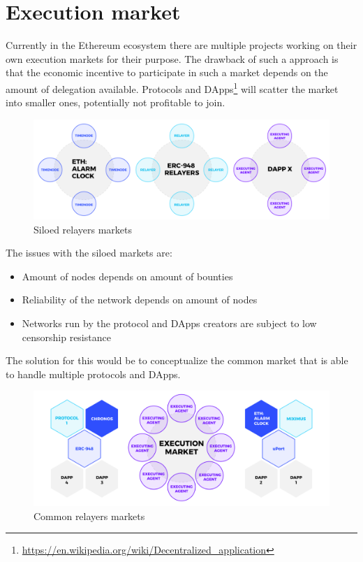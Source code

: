 \documentclass{report}
\begin{document}
  \section{Execution market}
  
  Currently in the Ethereum ecosystem there are multiple projects working on their own execution markets for their purpose. The drawback of such a approach is that the economic incentive to participate in such a market depends on the amount of delegation available. Protocols and DApps\footnote{\url{https://en.wikipedia.org/wiki/Decentralized_application}} will scatter the market into smaller ones, potentially not profitable to join.   

  \begin{figure}[h]
    \includegraphics[width=\textwidth]{silos}
    \caption{Siloed relayers markets}
  \end{figure}

  The issues with the siloed markets are:
  \begin{itemize}
    \item Amount of nodes depends on amount of bounties
    \item Reliability of the network depends on amount of nodes
    \item Networks run by the protocol and DApps creators are subject to low censorship resistance
  \end{itemize}

  The solution for this would be to conceptualize the common market that is able to handle multiple protocols and DApps.

  \begin{figure}[h]
    \includegraphics[width=\textwidth]{comon}
    \caption{Common relayers markets}
  \end{figure}
\end{document}
